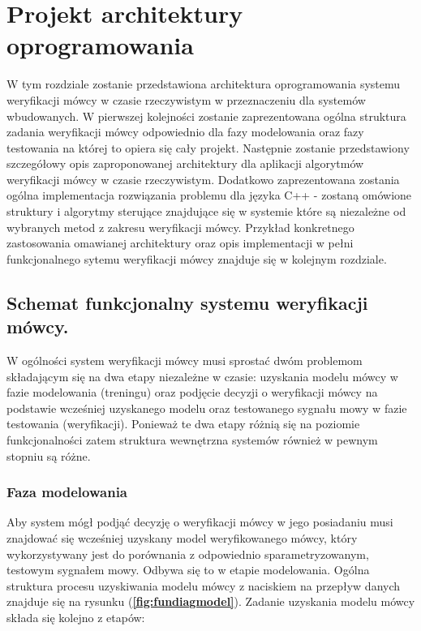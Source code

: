 \chapter{Projekt architektury oprogramowania}

W tym rozdziale zostanie przedstawiona architektura oprogramowania systemu weryfikacji mówcy w czasie rzeczywistym w przeznaczeniu dla systemów wbudowanych. W pierwszej kolejności zostanie zaprezentowana ogólna struktura zadania weryfikacji mówcy odpowiednio dla fazy modelowania oraz fazy testowania na której to opiera się cały projekt. Następnie zostanie przedstawiony szczegółowy opis zaproponowanej architektury dla aplikacji algorytmów weryfikacji mówcy w czasie rzeczywistym. Dodatkowo zaprezentowana zostania ogólna implementacja rozwiązania problemu dla języka C++ - zostaną omówione struktury i algorytmy sterujące znajdujące się w systemie które są niezależne od wybranych metod z zakresu weryfikacji mówcy. Przykład konkretnego zastosowania omawianej architektury oraz opis implementacji w pełni funkcjonalnego sytemu weryfikacji mówcy znajduje się w kolejnym rozdziale.

\section{Schemat funkcjonalny systemu weryfikacji mówcy.}
\label{funcioniert}

W ogólności system weryfikacji mówcy musi sprostać dwóm problemom składającym się na dwa etapy niezależne w czasie: uzyskania modelu mówcy w fazie modelowania (treningu) oraz podjęcie decyzji o weryfikacji mówcy na podstawie wcześniej uzyskanego modelu oraz testowanego sygnału mowy w fazie testowania (weryfikacji). Ponieważ te dwa etapy różnią się na poziomie funkcjonalności zatem struktura wewnętrzna systemów również w pewnym stopniu są różne.

\subsection{Faza modelowania}

Aby system mógł podjąć decyzję o weryfikacji mówcy w jego posiadaniu musi znajdować się wcześniej uzyskany model weryfikowanego mówcy, który wykorzystywany jest do porównania z odpowiednio sparametryzowanym, testowym sygnałem mowy. Odbywa się to w etapie modelowania. Ogólna struktura procesu uzyskiwania modelu mówcy z naciskiem na przepływ danych znajduje się na rysunku (\textbf{\ref{fig:fundiagmodel}}). Zadanie uzyskania modelu mówcy składa się kolejno z etapów:

